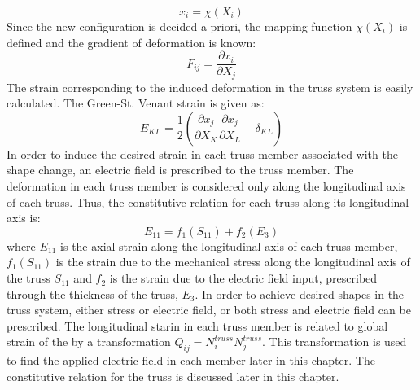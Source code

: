 \begin{equation}  
x_i=\chi (X_i)   
\label{lagrangian_descriptoin} 
\end{equation}
Since the new configuration is decided a priori, the mapping function $\chi (X_i)$ is defined and the gradient of deformation is known:
\begin{equation}
F_{ij}=\frac{\partial x_i}{\partial X_j}
\label{deformation_gradient_tensor}
\end{equation}
The strain corresponding to the induced deformation in the truss system is easily calculated.  
The Green-St. Venant strain is given as:
\begin{equation}
E_{KL}=\frac{1}{2}\left( \frac{\partial x_j}{\partial X_K}\frac{\partial x_j}{\partial X_L}-\delta_{KL}\right)
\label{lagrange_green_strain}
\end{equation}
In order to induce the desired strain in each truss member associated with the shape change, an electric field is prescribed to the truss member. The deformation in each truss member is considered only along the longitudinal axis of each truss. Thus, the constitutive relation for each truss along its longitudinal axis is: 
\begin{equation}
E_{11}=f_1(S_{11})+f_2(E_3)
\label{one_constitutive_equation}
\end{equation}
where $E_{11}$ is the axial strain along the longitudinal axis of each truss member, $f_1(S_{11})$ is the strain due to the mechanical stress along the longitudinal axis of the truss $S_{11}$ and $f_2$ is the strain due to the electric field input, prescribed through the thickness of the truss, $E_3$.
In order to achieve desired shapes in the truss system, either stress or electric field, or both stress and electric field can be prescribed.
The longitudinal starin in each truss member is related to global strain of the by a transformation $Q_{ij}=N^{truss}_i N^{truss}_j$. 
This transformation is used to find the applied electric field in each member later in this chapter.
The constitutive relation for the truss is discussed later in this chapter.

